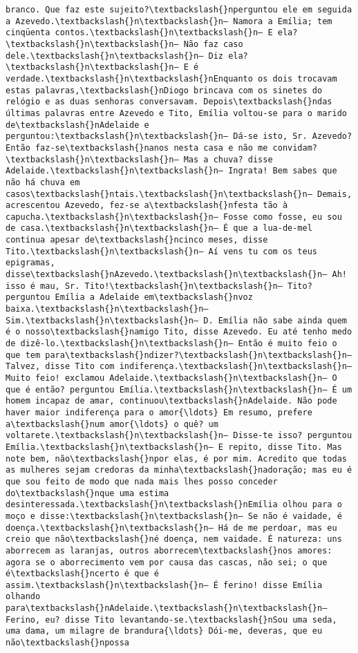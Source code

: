 \documentclass[11pt]{article}
\begin{document}
\begin{Verbatim}[commandchars=\\\{\}]
branco. Que faz este sujeito?\textbackslash{}nperguntou ele em seguida a Azevedo.\textbackslash{}n\textbackslash{}n— Namora a Emília; tem cinqüenta contos.\textbackslash{}n\textbackslash{}n— E ela?\textbackslash{}n\textbackslash{}n— Não faz caso dele.\textbackslash{}n\textbackslash{}n— Diz ela?\textbackslash{}n\textbackslash{}n— E é verdade.\textbackslash{}n\textbackslash{}nEnquanto os dois trocavam estas palavras,\textbackslash{}nDiogo brincava com os sinetes do relógio e as duas senhoras conversavam. Depois\textbackslash{}ndas últimas palavras entre Azevedo e Tito, Emília voltou-se para o marido de\textbackslash{}nAdelaide e perguntou:\textbackslash{}n\textbackslash{}n— Dá-se isto, Sr. Azevedo? Então faz-se\textbackslash{}nanos nesta casa e não me convidam?\textbackslash{}n\textbackslash{}n— Mas a chuva? disse Adelaide.\textbackslash{}n\textbackslash{}n— Ingrata! Bem sabes que não há chuva em casos\textbackslash{}ntais.\textbackslash{}n\textbackslash{}n— Demais, acrescentou Azevedo, fez-se a\textbackslash{}nfesta tão à capucha.\textbackslash{}n\textbackslash{}n— Fosse como fosse, eu sou de casa.\textbackslash{}n\textbackslash{}n— É que a lua-de-mel continua apesar de\textbackslash{}ncinco meses, disse Tito.\textbackslash{}n\textbackslash{}n— Aí vens tu com os teus epigramas, disse\textbackslash{}nAzevedo.\textbackslash{}n\textbackslash{}n— Ah! isso é mau, Sr. Tito!\textbackslash{}n\textbackslash{}n— Tito? perguntou Emília a Adelaide em\textbackslash{}nvoz baixa.\textbackslash{}n\textbackslash{}n— Sim.\textbackslash{}n\textbackslash{}n— D. Emília não sabe ainda quem é o nosso\textbackslash{}namigo Tito, disse Azevedo. Eu até tenho medo de dizê-lo.\textbackslash{}n\textbackslash{}n— Então é muito feio o que tem para\textbackslash{}ndizer?\textbackslash{}n\textbackslash{}n— Talvez, disse Tito com indiferença.\textbackslash{}n\textbackslash{}n— Muito feio! exclamou Adelaide.\textbackslash{}n\textbackslash{}n— O que é então? perguntou Emília.\textbackslash{}n\textbackslash{}n— É um homem incapaz de amar, continuou\textbackslash{}nAdelaide. Não pode haver maior indiferença para o amor{\ldots} Em resumo, prefere a\textbackslash{}num amor{\ldots} o quê? um voltarete.\textbackslash{}n\textbackslash{}n— Disse-te isso? perguntou Emília.\textbackslash{}n\textbackslash{}n— E repito, disse Tito. Mas note bem, não\textbackslash{}npor elas, é por mim. Acredito que todas as mulheres sejam credoras da minha\textbackslash{}nadoração; mas eu é que sou feito de modo que nada mais lhes posso conceder do\textbackslash{}nque uma estima desinteressada.\textbackslash{}n\textbackslash{}nEmília olhou para o moço e disse:\textbackslash{}n\textbackslash{}n— Se não é vaidade, é doença.\textbackslash{}n\textbackslash{}n— Há de me perdoar, mas eu creio que não\textbackslash{}né doença, nem vaidade. É natureza: uns aborrecem as laranjas, outros aborrecem\textbackslash{}nos amores: agora se o aborrecimento vem por causa das cascas, não sei; o que é\textbackslash{}ncerto é que é assim.\textbackslash{}n\textbackslash{}n— É ferino! disse Emília olhando para\textbackslash{}nAdelaide.\textbackslash{}n\textbackslash{}n— Ferino, eu? disse Tito levantando-se.\textbackslash{}nSou uma seda, uma dama, um milagre de brandura{\ldots} Dói-me, deveras, que eu não\textbackslash{}npossa 
\end{Verbatim}
\end{document}
